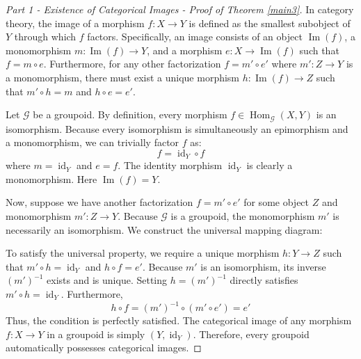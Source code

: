 \documentclass{amsart}
\begin{document}
\begin{proof}[Part 1 - Existence of Categorical Images - Proof of Theorem \ref{main3}]
In category theory, the image of a morphism $f: X \to Y$ is defined as the smallest subobject of $Y$ through which $f$ factors. Specifically, an image consists of an object $\operatorname{Im}(f)$, a monomorphism $m: \operatorname{Im}(f) \to Y$, and a morphism $e: X \to \operatorname{Im}(f)$ such that $f = m \circ e$. Furthermore, for any other factorization $f = m' \circ e'$ where $m': Z \to Y$ is a monomorphism, there must exist a unique morphism $h: \operatorname{Im}(f) \to Z$ such that $m' \circ h = m$ and $h \circ e = e'$.

Let $\mathcal{G}$ be a groupoid. By definition, every morphism $f \in \operatorname{Hom}_\mathcal{G}(X, Y)$ is an isomorphism. Because every isomorphism is simultaneously an epimorphism and a monomorphism, we can trivially factor $f$ as:
\begin{equation}
    f = \operatorname{id}_Y \circ f
\end{equation}
where $m = \operatorname{id}_Y$ and $e = f$. The identity morphism $\operatorname{id}_Y$ is clearly a monomorphism. Here $\operatorname{Im}(f) = Y$.

Now, suppose we have another factorization $f = m' \circ e'$ for some object $Z$ and monomorphism $m': Z \to Y$. Because $\mathcal{G}$ is a groupoid, the monomorphism $m'$ is necessarily an isomorphism. We construct the universal mapping diagram:

\begin{center}
\end{center}

To satisfy the universal property, we require a unique morphism $h: Y \to Z$ such that $m' \circ h = \operatorname{id}_Y$ and $h \circ f = e'$. Because $m'$ is an isomorphism, its inverse $(m')^{-1}$ exists and is unique. Setting $h = (m')^{-1}$ directly satisfies $m' \circ h = \operatorname{id}_Y$. Furthermore, 
\begin{equation}
    h \circ f = (m')^{-1} \circ (m' \circ e') = e'
\end{equation}
Thus, the condition is perfectly satisfied. The categorical image of any morphism $f: X \to Y$ in a groupoid is simply $(Y, \operatorname{id}_Y)$. Therefore, every groupoid automatically possesses categorical images.
\end{proof}
\end{document}
